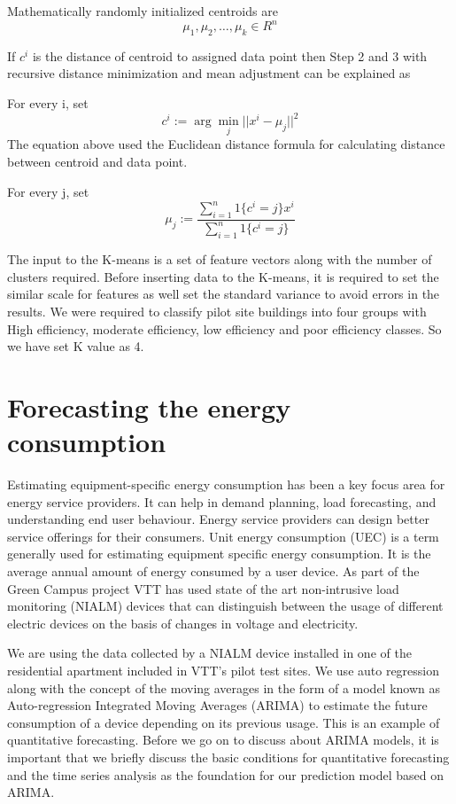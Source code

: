 Mathematically randomly initialized centroids are  
$${\mu_1,\mu_2,\dotsc,\mu_k}  \in R^{n}$$


If \(c^{i}\) is the distance of centroid to assigned data point then Step 2 and 3 with recursive distance minimization and mean adjustment can be explained as 

For every i, set 
\begin{equation}
c^{i} := \arg\min_j || x^{i} - \mu_j||^2
\end{equation} 
The equation above used the Euclidean distance formula for calculating distance between centroid and data point. 

For every j, set
\begin{equation}
\mu_{j} := \frac{\sum\limits_{i=1}^n 1\{c^{i} =j\}x^{i}}{\sum\limits_{i=1}^n 1\{c^{i}=j\}}
\end{equation}

The input to the K-means is a set of feature vectors along with the number of clusters required. Before inserting data to the K-means, it is required to set the similar scale for features as well set the standard variance to avoid errors in the results. We were required to classify pilot site buildings into four groups with High efficiency, moderate efficiency, low efficiency and poor efficiency classes. So we have set K value as 4.

\section{Forecasting the energy consumption}\label{predict}
Estimating equipment-specific energy consumption has been a key focus area for energy service providers. It can help in demand planning, load forecasting, and understanding end user behaviour.  Energy service providers can design better service offerings for their consumers. Unit energy consumption (UEC) is a term generally used for estimating equipment specific energy consumption. It is the average annual amount of energy consumed by a user device. As part of the Green Campus project VTT has used state of the art non-intrusive load monitoring (NIALM) \cite{hart1992nonintrusive} devices that can distinguish between the usage of different electric devices on the basis of changes in voltage and electricity. 

We are using the data collected by a NIALM device installed in one of the residential apartment included in VTT's pilot test sites. We use auto regression along with the concept of the moving averages in the form of a model known as Auto-regression Integrated Moving Averages (ARIMA) to estimate the future consumption of a device depending on its previous usage. This is an example of quantitative forecasting. Before we go on to discuss about ARIMA models, it is important that we briefly discuss the basic conditions for quantitative forecasting and the time series analysis as the foundation for our prediction model based on ARIMA.
